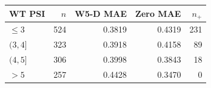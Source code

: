 
{\small\setlength{\tabcolsep}{4pt}
\begin{tabularx}{\textwidth}{Xrrrr}
\toprule
WT PSI & $n$ & W5-D MAE & Zero MAE & $n_{+}$ \\
\midrule
$\le3$ & 524 & 0.3819 & 0.4319 & 231 \\
$(3,4]$ & 323 & 0.3918 & 0.4158 & 89 \\
$(4,5]$ & 306 & 0.3998 & 0.3843 & 18 \\
$>5$ & 257 & 0.4428 & 0.3470 & 0 \\
\bottomrule
\end{tabularx}}
